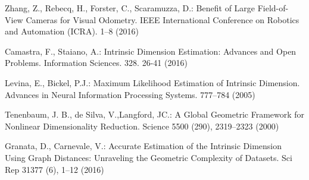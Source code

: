 \documentclass[conference]{IEEEtran} %
\begin{document}
\begin{thebibliography}{100}














Zhang, Z., Rebecq, H., Forster, C., Scaramuzza, D.:
Benefit of Large Field-of-View Cameras for Visual Odometry.
IEEE International Conference on Robotics and Automation (ICRA).
1--8 (2016)

Camastra, F., Staiano, A.:
Intrinsic Dimension Estimation: Advances and Open Problems.
Information Sciences. 328. 26-41 (2016)

Levina, E., Bickel, P.J.:
Maximum Likelihood Estimation of Intrinsic Dimension.
Advances in Neural Information Processing Systems.
777--784 (2005)

Tenenbaum, J. B., de Silva, V.,Langford, JC.:
A Global Geometric Framework for Nonlinear Dimensionality Reduction.
Science 5500 (290), 2319--2323 (2000)

Granata, D., Carnevale, V.:
Accurate Estimation of the Intrinsic Dimension Using Graph Distances: Unraveling the Geometric Complexity of Datasets.
Sci Rep 31377 (6),
1--12 (2016)

\end{thebibliography}
\end{document}
